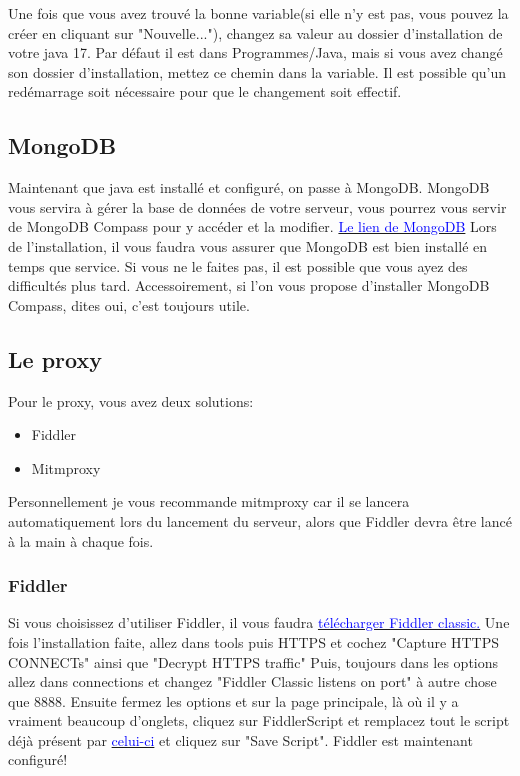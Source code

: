 \documentclass{article}
\begin{document}
Une fois que vous avez trouvé la bonne variable(si elle n'y est pas, vous pouvez la créer en cliquant sur "Nouvelle..."), changez sa valeur au dossier d'installation de votre java 17. Par défaut il est dans Programmes/Java, mais si vous avez changé son dossier d'installation, mettez ce chemin dans la variable. Il est possible qu'un redémarrage soit nécessaire pour que le changement soit effectif.

\subsection{MongoDB}
Maintenant que java est installé et configuré, on passe à MongoDB.\newline
MongoDB vous servira à gérer la base de données de votre serveur, vous pourrez vous servir de MongoDB Compass pour y accéder et la modifier.\newline
\href{https://fastdl.mongodb.org/windows/mongodb-windows-x86_64-5.0.7-signed.msi}{\textcolor{blue}{Le lien de MongoDB}}\newline
Lors de l'installation, il vous faudra vous assurer que MongoDB est bien installé en temps que service. Si vous ne le faites pas, il est possible que vous ayez des difficultés plus tard. Accessoirement, si l'on vous propose d'installer MongoDB Compass, dites oui, c'est toujours utile.

\subsection{Le proxy}
Pour le proxy, vous avez deux solutions:
\begin{itemize}
	\item Fiddler
	\item Mitmproxy
\end{itemize}
Personnellement je vous recommande mitmproxy car il se lancera automatiquement lors du lancement du serveur, alors que Fiddler devra être lancé à la main à chaque fois.

\subsubsection{Fiddler}
Si vous choisissez d'utiliser Fiddler, il vous faudra \href{https://www.telerik.com/download/fiddler/fiddler4}{\textcolor{blue}{télécharger Fiddler classic.}}\newline
Une fois l'installation faite, allez dans tools puis HTTPS et cochez "Capture HTTPS CONNECTs" ainsi que "Decrypt HTTPS traffic"\newline
Puis, toujours dans les options allez dans connections et changez "Fiddler Classic listens on port" à autre chose que 8888.\newline
Ensuite fermez les options et sur la page principale, là où il y a vraiment beaucoup d'onglets, cliquez sur FiddlerScript et remplacez tout le script déjà présent par \href{https://github.lunatic.moe/fiddlerscript}{\textcolor{blue}{celui-ci}} et cliquez sur "Save Script".\newline
Fiddler est maintenant configuré!
\end{document}
